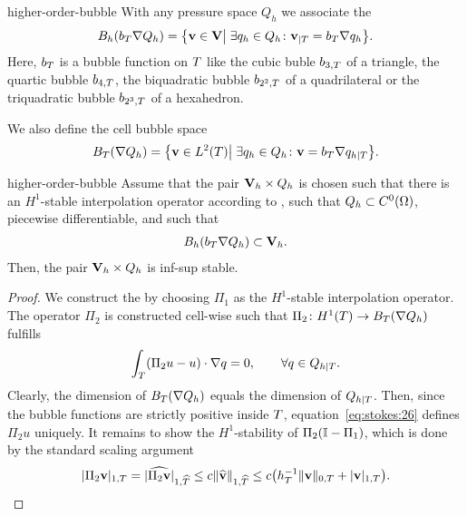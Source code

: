 \begin{Definition}{higher-order-bubble}
  With any pressure space $Q_h$ we associate the 
  \begin{gather}
    \label{eq:stokes:24}
    B_h(b_T \nabla Q_h)
    = \bigl\{ \mathbf v\in \mathbf V \big\vert
    \; \exists q_h\in Q_h \colon \mathbf v_{|T} = b_T \nabla q_h \bigr\}.
  \end{gather}
  Here, $b_T$ is a bubble function on $T$ like the cubic buble
  $b_{3,T}$ of a triangle, the quartic bubble $b_{4,T}$, the
  biquadratic bubble $b_{2^2,T}$ of a quadrilateral or the
  triquadratic bubble $b_{2^3,T}$ of a hexahedron.

  We also define the cell bubble space
  \begin{gather}
    \label{eq:stokes:25}
    B_T(\nabla Q_h) = \bigl\{ \mathbf v\in L^2(T) \big\vert
    \;\exists q_h\in Q_h \colon \mathbf v = b_T \nabla q_{h|T}\bigr\}.
  \end{gather}
\end{Definition}

\begin{Theorem}{higher-order-bubble}
  Assume that the pair $\mathbf V_h\times Q_h$ is chosen such that there is
  an $H^1$-stable interpolation operator according to
  , such that $Q_h\subset
  C^0(\Omega)$, piecewise differentiable, and such that
  \begin{gather}
    B_h(b_T \nabla Q_h) \subset \mathbf V_h.
  \end{gather}
  Then, the pair $\mathbf V_h\times Q_h$ is inf-sup stable.
\end{Theorem}

\begin{proof}
  We construct the  by
   choosing $\Pi_1$ as the
  $H^1$-stable interpolation operator. The operator $\Pi_2$ is
  constructed cell-wise such that $\Pi_2\colon H^1(T) \to
  B_T(\nabla Q_h)$ fulfills
  \begin{gather}
    \label{eq:stokes:26}
    \int_T (\Pi_2 u - u) \cdot\nabla q = 0,
    \qquad
    \forall q\in Q_{h|T}.
  \end{gather}
  Clearly, the dimension of $B_T(\nabla Q_h)$ equals the dimension
  of $Q_{h|T}$. Then, since the bubble functions are strictly
  positive inside $T$, equation~\eqref{eq:stokes:26} defines
  $\Pi_2 u$ uniquely. It remains to show the $H^1$-stability of
  $\Pi_2(\mathbb I-\Pi_1)$, which is done by the standard scaling
  argument
  \begin{gather}
    \lvert\Pi_2 \mathbf v\rvert_{1,T}
    =\lvert\widehat{\Pi_2 \mathbf v}\rvert_{1,\widehat{T}}
    \le c \lVert\widehat {\mathbf v}\rVert_{1,\widehat{T}}
    \le c \bigl(h_T^{-1} \lVert\mathbf v\rVert_{0,T} + \lvert\mathbf v\rvert_{1,T}\bigr).
  \end{gather}
\end{proof}

